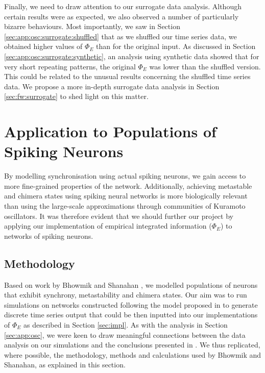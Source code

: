 \documentclass[a4paper,11pt]{article}
\begin{document}
Finally, we need to draw attention to our surrogate data analysis. Although certain results were as expected, we also observed a number of particularly bizarre behaviours. Most importantly, we saw in Section \ref{sec:app:osc:surrogate:shuffled} that as we shuffled our time series data, we obtained higher values of $\Phi_E$ than for the original input. As discussed in Section \ref{sec:app:osc:surrogate:synthetic}, an analysis using synthetic data showed that for very short repeating patterns, the original $\Phi_E$ was lower than the shuffled version. This could be related to the unusual results concerning the shuffled time series data. We propose a more in-depth surrogate data analysis in Section \ref{sec:fw:surrogate} to shed light on this matter.

\clearpage

\section{Application to Populations of Spiking Neurons}
\label{MSUSNN}
By modelling synchronisation using actual spiking neurons, we gain access to more fine-grained properties of the network. Additionally, achieving metastable and chimera states using spiking neural networks is more biologically relevant than using the large-scale approximations through communities of Kuramoto oscillators. It was therefore evident that we should further our project by applying our implementation of empirical integrated information ($\Phi_E$) to networks of spiking neurons.

\subsection{Methodology}
\label{sec:snn:methods}

Based on work by Bhowmik and Shanahan \cite{Bhowmik2013}, we modelled populations of neurons that exhibit synchrony, metastability and chimera states. Our aim was to run simulations on networks constructed following the model proposed in \cite{Bhowmik2013} to generate discrete time series output that could be then inputted into our implementations of $\Phi_E$ as described in Section \ref{sec:impl}. As with the analysis in Section \ref{sec:app:osc}, we were keen to draw meaningful connections between the data analysis on our simulations and the conclusions presented in \cite{Bhowmik2013}. We thus replicated, where possible, the methodology, methods and calculations used by Bhowmik and Shanahan, as explained in this section.
\end{document}
